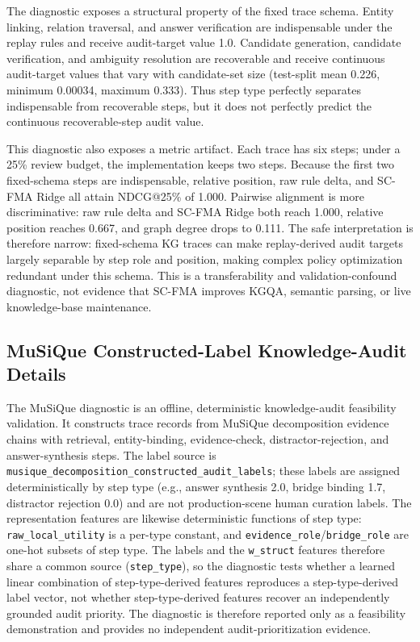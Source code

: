 \documentclass[a4paper,fleqn]{cas-sc}
\begin{document}
The diagnostic exposes a structural property of the fixed trace schema. Entity linking, relation traversal, and answer verification are indispensable under the replay rules and receive audit-target value 1.0. Candidate generation, candidate verification, and ambiguity resolution are recoverable and receive continuous audit-target values that vary with candidate-set size (test-split mean 0.226, minimum 0.00034, maximum 0.333). Thus step type perfectly separates indispensable from recoverable steps, but it does not perfectly predict the continuous recoverable-step audit value.

This diagnostic also exposes a metric artifact. Each trace has six steps; under a 25\% review budget, the implementation keeps two steps. Because the first two fixed-schema steps are indispensable, relative position, raw rule delta, and SC-FMA Ridge all attain NDCG@25\% of 1.000. Pairwise alignment is more discriminative: raw rule delta and SC-FMA Ridge both reach 1.000, relative position reaches 0.667, and graph degree drops to 0.111. The safe interpretation is therefore narrow: fixed-schema KG traces can make replay-derived audit targets largely separable by step role and position, making complex policy optimization redundant under this schema. This is a transferability and validation-confound diagnostic, not evidence that SC-FMA improves KGQA, semantic parsing, or live knowledge-base maintenance.

\subsection{MuSiQue Constructed-Label Knowledge-Audit Details}
\label{app:musique-knowledge-audit}

The MuSiQue diagnostic is an offline, deterministic knowledge-audit feasibility validation. It constructs trace records from MuSiQue decomposition evidence chains with retrieval, entity-binding, evidence-check, distractor-rejection, and answer-synthesis steps. The label source is \texttt{musique\_decomposition\_constructed\_audit\_labels}; these labels are assigned deterministically by step type (e.g., answer synthesis 2.0, bridge binding 1.7, distractor rejection 0.0) and are not production-scene human curation labels. The representation features are likewise deterministic functions of step type: \texttt{raw\_local\_utility} is a per-type constant, and \texttt{evidence\_role}/\texttt{bridge\_role} are one-hot subsets of step type. The labels and the \texttt{w\_struct} features therefore share a common source (\texttt{step\_type}), so the diagnostic tests whether a learned linear combination of step-type-derived features reproduces a step-type-derived label vector, not whether step-type-derived features recover an independently grounded audit priority. The diagnostic is therefore reported only as a feasibility demonstration and provides no independent audit-prioritization evidence.
\end{document}
